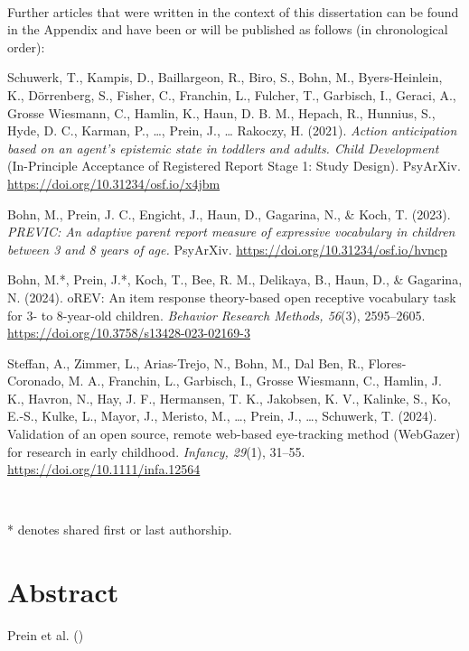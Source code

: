 \documentclass[
]{scrbook}
\begin{document}
~

Further articles that were written in the context of this dissertation can be found in the Appendix and have been or will be published as follows (in chronological order):

Schuwerk, T., Kampis, D., Baillargeon, R., Biro, S., Bohn, M., Byers-Heinlein, K., Dörrenberg, S., Fisher, C., Franchin, L., Fulcher, T., Garbisch, I., Geraci, A., Grosse Wiesmann, C., Hamlin, K., Haun, D. B. M., Hepach, R., Hunnius, S., Hyde, D. C., Karman, P., \ldots, Prein, J., \ldots{} Rakoczy, H. (2021). \emph{Action anticipation based on an agent's epistemic state in toddlers and adults. Child Development} (In-Principle Acceptance of Registered Report Stage 1: Study Design). PsyArXiv. \url{https://doi.org/10.31234/osf.io/x4jbm}

Bohn, M., Prein, J. C., Engicht, J., Haun, D., Gagarina, N., \& Koch, T. (2023). \emph{PREVIC: An adaptive parent report measure of expressive vocabulary in children between 3 and 8 years of age.} PsyArXiv. \url{https://doi.org/10.31234/osf.io/hvncp}

Bohn, M.*, Prein, J.*, Koch, T., Bee, R. M., Delikaya, B., Haun, D., \& Gagarina, N. (2024). oREV: An item response theory-based open receptive vocabulary task for 3- to 8-year-old children. \emph{Behavior Research Methods, 56}(3), 2595--2605. \url{https://doi.org/10.3758/s13428-023-02169-3}

Steffan, A., Zimmer, L., Arias-Trejo, N., Bohn, M., Dal Ben, R., Flores-Coronado, M. A., Franchin, L., Garbisch, I., Grosse Wiesmann, C., Hamlin, J. K., Havron, N., Hay, J. F., Hermansen, T. K., Jakobsen, K. V., Kalinke, S., Ko, E.-S., Kulke, L., Mayor, J., Meristo, M., \ldots, Prein, J., \ldots, Schuwerk, T. (2024). Validation of an open source, remote web-based eye-tracking method (WebGazer) for research in early childhood. \emph{Infancy, 29}(1), 31--55. \url{https://doi.org/10.1111/infa.12564}

~

* denotes shared first or last authorship.

\chapter{Abstract}\label{abstract}

Prein et al. ()
\end{document}
